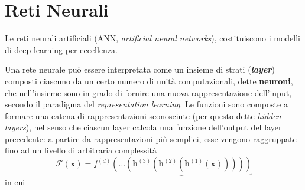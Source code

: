 \section{Reti Neurali}
\label{ANN}

Le reti neurali artificiali (ANN, \textit{artificial neural networks}), costituiscono i modelli di deep learning per eccellenza.

Una rete neurale può essere interpretata come un insieme di strati (\textbf{\textit{layer}}) composti ciascuno da un certo numero di unità computazionali, dette \textbf{neuroni}, che nell'insieme sono in grado di fornire una nuova rappresentazione dell'input, secondo il paradigma del \textit{representation learning}. Le funzioni sono composte a formare una catena di rappresentazioni sconosciute (per questo dette \textit{hidden layers}), nel senso che ciascun layer calcola una funzione dell'output del layer precedente: a partire da rappresentazioni più semplici, esse vengono raggruppate fino ad un livello di arbitraria complessità
\begin{equation*}
\mathcal{F}(\mathbf{x})=f^{(d)}\underbrace{(\dots(\mathbf{h}^{(3)}(\mathbf{h}^{(2)}(\mathbf{h}^{(1)}(\mathbf{x})))))}
\end{equation*}
in cui
